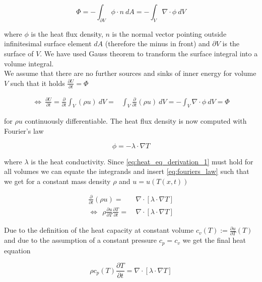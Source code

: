 \documentclass{scrartcl}[12pt, halfparskip]
\numberwithin{equation}{section}
\numberwithin{figure}{section}
\numberwithin{table}{section}
\begin{document}
\begin{equation}
	\varPhi = - \int_{\partial V} \phi \cdot n \ dA = - \int_{V} \nabla \cdot \phi \ dV
\end{equation}

where $\phi$ is the heat flux density, $n$ is the normal vector pointing outside infinitesimal surface element $dA$ (therefore the minus in front) and $\partial V$ is the surface of $V$. We have used Gauss theorem to transform the surface integral into a volume integral. \\
We assume that there are no further sources and sinks of inner energy for volume $V$ such that it holds $\frac{\partial U}{\partial t} = \varPhi$

\begin{align}
	\Leftrightarrow \ \frac{\partial U}{\partial t} = \frac{\partial}{\partial t} \int_V (\rho u) \ dV = & \int_V \frac{\partial}{\partial t}(\rho u) \ dV = - \int_{V} \nabla \cdot \phi \ dV = \varPhi
	\label{eq:heat_eq_derivation_1}
\end{align}

for $\rho u$ continuously differentiable. The heat flux density is now computed with Fourier's law

\begin{equation}
	\phi = - \lambda \cdot \nabla T
	\label{eq:fouriers_law}
\end{equation}

where $\lambda$ is the heat conductivity. Since \cref{eq:heat_eq_derivation_1} must hold for all volumes we can equate the integrands and insert \cref{eq:fouriers_law} such that we get for a constant mass density $\rho$ and $u = u(T(x,t))$

\begin{align}
	\frac{\partial}{\partial t}(\rho u) = & \ \nabla \cdot \left[ \lambda \cdot \nabla T \right] \\
	\Leftrightarrow \ \ \rho \frac{\partial u}{\partial T} \frac{\partial T}{\partial t} = & \ \nabla \cdot \left[ \lambda \cdot \nabla T \right]
\end{align}

Due to the definition of the heat capacity at constant volume $c_v(T) := \frac{\partial u}{\partial T}(T)$ and due to the assumption of a constant pressure $c_p = c_v$ we get the final heat equation

\begin{equation}
	\rho c_p(T) \frac{\partial T}{\partial t} = \nabla \cdot \left[ \lambda \cdot \nabla T \right]
	\label{eq:heat_equation_derivation}
\end{equation}
\end{document}
